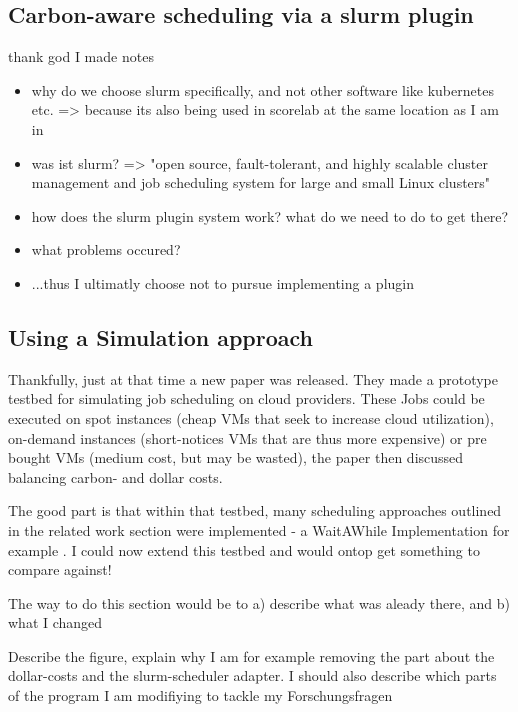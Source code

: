 \subsection{Carbon-aware scheduling via a slurm plugin}

thank god I made notes

\begin{itemize}
    \item why do we choose slurm specifically, and not other software like kubernetes etc. => because its also being used in scorelab at the same location as I am in
    \item was ist slurm? => "open source, fault-tolerant, and highly scalable cluster management and job scheduling system for large and small Linux clusters"
    \item how does the slurm plugin system work? what do we need to do to get there?
    \item what problems occured?
    \item ...thus I ultimatly choose not to pursue implementing a plugin
\end{itemize}

\subsection{Using a Simulation approach}

Thankfully, just at that time a new paper \cite{hanafy_going_2024} was released. 
They made a prototype testbed for simulating job scheduling on cloud providers. These Jobs could be executed on spot instances (cheap VMs that seek to increase cloud utilization), on-demand instances (short-notices VMs that are thus more expensive) or pre bought VMs (medium cost, but may be wasted), the paper then discussed balancing carbon- and dollar costs.

The good part is that within that testbed, many scheduling approaches outlined in the related work section were implemented - a WaitAWhile Implementation for example . I could now extend this testbed and would ontop get something to compare against!

The way to do this section would be to a) describe what was aleady there, and b) what I changed


Describe the figure, explain why I am for example removing the part about the dollar-costs and the slurm-scheduler adapter. I should also describe which parts of the program I am modifiying to tackle my Forschungsfragen


